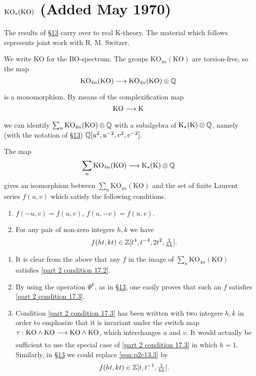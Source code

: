 \documentclass[../main]{subfiles}
\begin{document}
\label{sec:p2c17}

\chapter{$\mathrm{KO}_\ast(\mathrm{KO})$ (Added May 1970)} %

The results of \hyperref[sec:p2c13]{\S13} carry over to real K-theory. The material which follows represents joint work with R. M. Switzer.

We write $\mathrm{KO}$ for the BO-spectrum. The groups $\mathrm{KO}_{4n}(\mathrm{KO})$ are torsion-free, so the map
\[
\mathrm{KO}_{4n}(\mathrm{KO})
\lar{}
\mathrm{KO}_{4n}(\mathrm{KO}) \otimes \bbQ %
\]
is a monomorphism. By means of the complexification map
\[
\mathrm{KO}\lar{} \mathrm K
\]
we can identify $\sum_n \mathrm{KO}_{4n}(\mathrm{KO}) \otimes \mathbb{Q}$ with a subalgebra of $\mathrm K_\star(\mathrm K) \otimes \mathbb{Q}$, namely (with the notation of \hyperref[sec:p2c13]{\S 13}) $\mathbb{Q}[u^2,u^{-2},v^2,v^{-2}]$.

\begin{theorem} \label{thm:p2c17.1}
The map
\[
\sum_n \mathrm{KO}_{4n}(\mathrm{KO})
\lar{}
\mathrm K_\star(\mathrm K) \otimes \bbQ
\]
gives an isomorphism between $\sum_n \mathrm{KO}_{4n}(\mathrm{KO})$ and the set of finite Laurent series $f(u,v)$ which satisfy the following conditions.
    \begin{enumerate}[label=(\thechapter.\arabic*), start=2]
        \item \label{part 2 condition 17.2}
        $f(-u,v)=f(u,v)$, $f(u,-v)=f(u,v)$.
        \item \label{part 2 condition 17.3}
        For any pair of non-zero integers $h,k$ we have
        \[
        f(ht,kt)\in \mathbb{Z}[t^4,t^{-4},2t^2, \tfrac{1}{hk}].
        \]
    \end{enumerate}
\end{theorem}

\begin{notes}
    \begin{enumerate}[label=(\thechapter.\arabic*), start=4]
        \item \label{part 2 note 17.4}
        It is clear from the above that any $f$ in the image of $\sum_n \mathrm{KO}_{4n}(\mathrm{KO})$ satisfies \ref{part 2 condition 17.2}.
        \item \label{part 2 note 17.5}
        By using the operation $\Psi^k$, as in \hyperref[sec:p2c13]{\S 13}, one easily proves that such an $f$ satisfies \ref{part 2 condition 17.3}.
        \item \label{part 2 note 17.6}
        Condition \ref{part 2 condition 17.3} has been written with two integers $h,k$ in order to emphasize that it is invariant under the switch map $\tau: \mathrm{KO}\wedge \mathrm{KO} \lar{} \mathrm{KO} \wedge \mathrm{KO}$, which interchanges $u$ and $v$. It would actually be sufficient to use the special case of \ref{part 2 condition 17.3} in which $h=1$. Similarly, in \hyperref[sec:p2c13]{\S 13} we could replace \eqref{eqn:p2c13.3} by
        \[
        f(ht,kt) \in \mathbb{Z}[t,t^{-1}, \tfrac{1}{hk}].
        \]
    \end{enumerate}
\end{notes}
\end{document}
